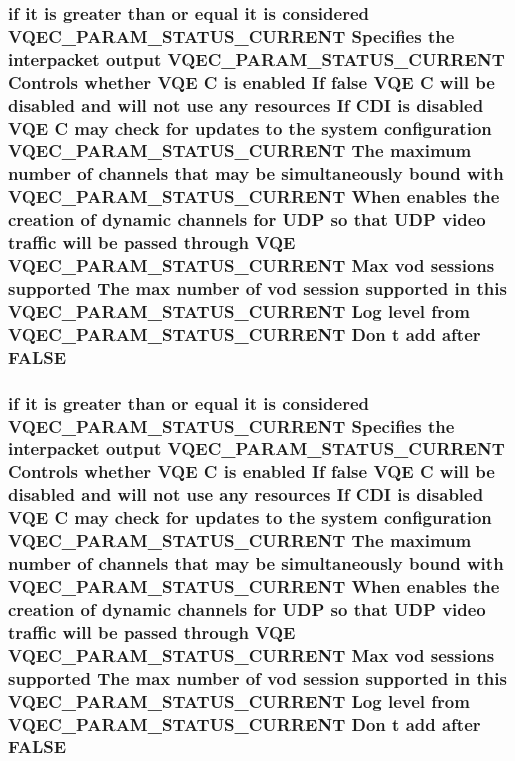 \subsubsection{\setlength{\rightskip}{0pt plus 5cm}if it is greater than or equal it is considered VQEC\_\-PARAM\_\-STATUS\_\-CURRENT Specifies the interpacket output VQEC\_\-PARAM\_\-STATUS\_\-CURRENT Controls whether VQE \bf{C} is enabled If false VQE \bf{C} will be disabled and will not use any resources If CDI is disabled VQE \bf{C} may check for updates \bf{to} the system configuration VQEC\_\-PARAM\_\-STATUS\_\-CURRENT The maximum number of \bf{channels} that may be simultaneously bound with VQEC\_\-PARAM\_\-STATUS\_\-CURRENT When enables the creation of dynamic \bf{channels} for UDP so that UDP video traffic will be passed through VQE VQEC\_\-PARAM\_\-STATUS\_\-CURRENT Max vod sessions supported The max number of vod session supported in \bf{this} VQEC\_\-PARAM\_\-STATUS\_\-CURRENT Log level from VQEC\_\-PARAM\_\-STATUS\_\-CURRENT Don t add after \bf{FALSE}}\label{vqec__cfg__settings_8h_969f99546ecc2fe02459c201773cd5ea}


\subsubsection{\setlength{\rightskip}{0pt plus 5cm}if it is greater than or equal it is considered VQEC\_\-PARAM\_\-STATUS\_\-CURRENT Specifies the interpacket output VQEC\_\-PARAM\_\-STATUS\_\-CURRENT Controls whether VQE \bf{C} is enabled If false VQE \bf{C} will be disabled and will not use any resources If CDI is disabled VQE \bf{C} may check for updates \bf{to} the system configuration VQEC\_\-PARAM\_\-STATUS\_\-CURRENT The maximum number of \bf{channels} that may be simultaneously bound with VQEC\_\-PARAM\_\-STATUS\_\-CURRENT When enables the creation of dynamic \bf{channels} for UDP so that UDP video traffic will be passed through VQE VQEC\_\-PARAM\_\-STATUS\_\-CURRENT Max vod sessions supported The max number of vod session supported in \bf{this} VQEC\_\-PARAM\_\-STATUS\_\-CURRENT Log level from VQEC\_\-PARAM\_\-STATUS\_\-CURRENT Don t add after \bf{FALSE}}\label{vqec__cfg__settings_8h_969f99546ecc2fe02459c201773cd5ea}


